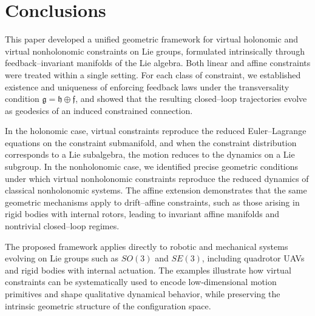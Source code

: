 \documentclass[letterpaper, 10 pt, conference]{ieeeconf}
\begin{document}

\section*{Conclusions}

This paper developed a unified geometric framework for virtual holonomic and virtual nonholonomic constraints on Lie groups, formulated intrinsically through feedback--invariant manifolds of the Lie algebra. Both linear and affine constraints were treated within a single setting. For each class of constraint, we established existence and uniqueness of enforcing feedback laws under the transversality condition $\mathfrak{g} = \mathfrak{h} \oplus \mathfrak{f}$, and showed that the resulting closed--loop trajectories evolve as geodesics of an induced constrained connection.

In the holonomic case, virtual constraints reproduce the reduced Euler--Lagrange equations on the constraint submanifold, and when the constraint distribution corresponds to a Lie subalgebra, the motion reduces to the dynamics on a Lie subgroup. In the nonholonomic case, we identified precise geometric conditions under which virtual nonholonomic constraints reproduce the reduced dynamics of classical nonholonomic systems. The affine extension demonstrates that the same geometric mechanisms apply to drift--affine constraints, such as those arising in rigid bodies with internal rotors, leading to invariant affine manifolds and nontrivial closed--loop regimes.

The proposed framework applies directly to robotic and mechanical systems evolving on Lie groups such as $SO(3)$ and $SE(3)$, including quadrotor UAVs and rigid bodies with internal actuation. The examples illustrate how virtual constraints can be systematically used to encode low-dimensional motion primitives and shape qualitative dynamical behavior, while preserving the intrinsic geometric structure of the configuration space.



\end{document}

